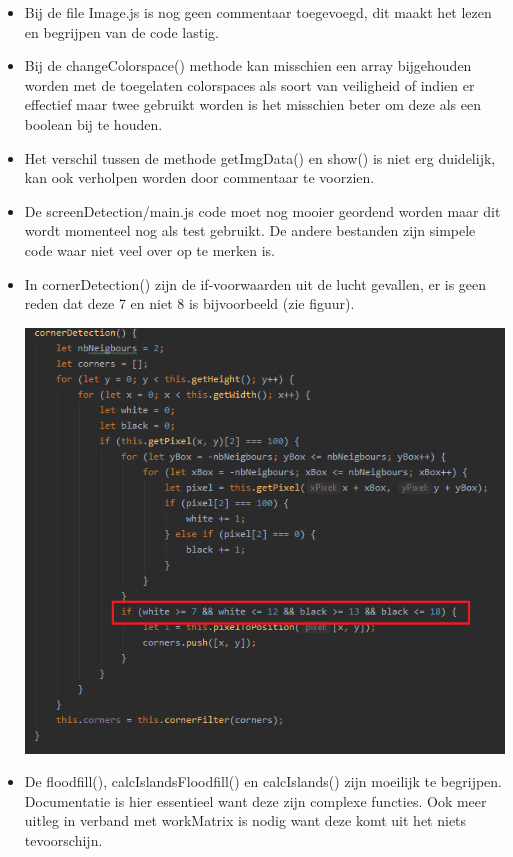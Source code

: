\documentclass[a4paper,11pt]{article}
\begin{document}
\begin{itemize}

\item Bij de file Image.js is nog geen commentaar toegevoegd, dit maakt het lezen en begrijpen van de code lastig.
\item Bij de changeColorspace() methode kan misschien een array bijgehouden worden met de toegelaten colorspaces als soort van veiligheid of indien er effectief maar twee gebruikt worden is het misschien beter om deze als een boolean bij te houden. 
\item Het verschil tussen de methode getImgData() en show() is niet erg duidelijk, kan ook verholpen worden door commentaar te voorzien.
\item De screenDetection/main.js code moet nog mooier geordend worden maar dit wordt momenteel nog als test gebruikt. De andere bestanden zijn simpele code waar niet veel over op te merken is.
\item In cornerDetection() zijn de if-voorwaarden uit de lucht gevallen, er is geen reden dat deze 7 en niet 8 is bijvoorbeeld (zie figuur).

\includegraphics[scale=0.75]{code1}
\item De floodfill(), calcIslandsFloodfill() en calcIslands() zijn moeilijk te begrijpen. Documentatie is hier essentieel want deze zijn complexe functies. Ook meer uitleg in verband met workMatrix is nodig want deze komt uit het niets tevoorschijn.


\end{itemize}
\end{document}
